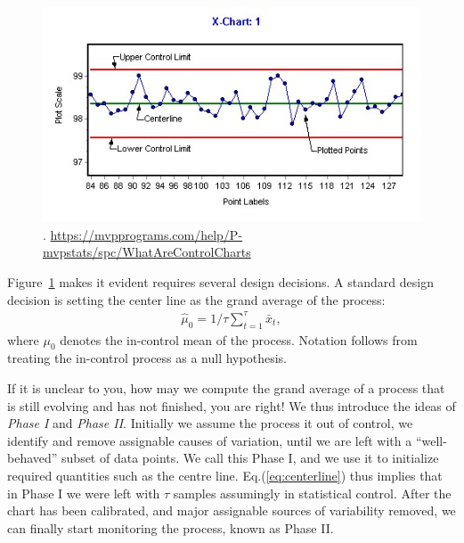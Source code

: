 \begin{figure}[h]
\centering
\includegraphics[height=0.3\textheight]{art/X-chartExample}
\caption[\barxChart]{\barxChart. \newline \url{https://mvpprograms.com/help/P-mvpstats/spc/WhatAreControlCharts}}
\label{fig:bar_x_chart}
\end{figure}






Figure~\ref{fig:bar_x_chart} makes it evident \barxChart requires several design decisions.
A standard design decision is setting the center line as the grand average of the process: 
\begin{align}
\label{eq:centerline}
	\hat{\mu}_0=1/\tau \sum_{t=1}^\tau \bar{x}_t,
\end{align}
where $\mu_0$ denotes the in-control mean of the process. Notation follows from treating the in-control process as a null hypothesis.


If it is unclear to you, how may we compute the grand average of a process that is still evolving and has not finished, you are right! We thus introduce the ideas of \emph{Phase I} and \emph{Phase II}. 
Initially we assume the process it out of control, we identify and remove assignable causes of variation, until we are left with a ``well-behaved'' subset of data points. We call this Phase I, and we use it to initialize required quantities such as the centre line. 
Eq.(\ref{eq:centerline}) thus implies that in Phase I we were left with $\tau$ samples assumingly in statistical control.
After the chart has been calibrated, and major assignable sources of variability removed, we can finally start monitoring the process, known as Phase II.



